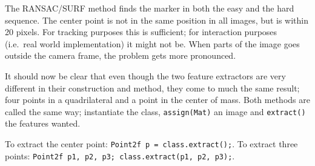 The RANSAC/SURF method finds the marker in both the easy and the hard sequence.
The center point is not in the same position in all images, but is within 20 pixels.
For tracking purposes this is sufficient; for interaction purposes (i.e.\ real world implementation) it might not be.
When parts of the image goes outside the camera frame, the problem gets more pronounced.


It should now be clear that even though the two feature extractors are very different in their construction and method,
they come to much the same result; four points in a quadrilateral and a point in the center of mass.
Both methods are called the same way; instantiate the class, \verb|assign(Mat)| an image and \verb|extract()| the features wanted.

To extract the center point: \verb|Point2f p = class.extract();|.
To extract three points: \verb|Point2f p1, p2, p3; class.extract(p1, p2, p3);|.
